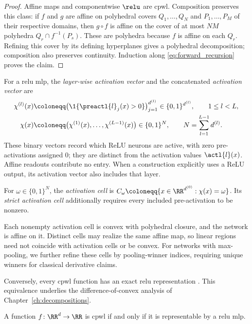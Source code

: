 \begin{proof}
Affine maps and componentwise $\relu$ are \ac{cpwl}. Composition preserves this class: if $f$ and $g$ are affine on polyhedral covers $Q_1, \ldots, Q_N$ and $P_1, \ldots, P_M$ of their respective domains, then $g\circ f$ is affine on the cover of at most $NM$ polyhedra $Q_r\cap f^{-1}(P_s)$. These are polyhedra because $f$ is affine on each $Q_r$. Refining this cover by its defining hyperplanes gives a polyhedral decomposition; composition also preserves continuity. Induction along \eqref{eq:forward_recursion} proves the claim.
\end{proof}

\begin{definition}\label{def:activation_vector}
For a \ac{relu} \ac{mlp}, the \emph{layer-wise activation vector} and the concatenated \emph{activation vector} are
\begin{align}
 \chi^{(l)}(x)&\coloneqq\bigl(\1\{\preactl{l}_j(x)>0\}\bigr)_{j=1}^{d^{(l)}}\in\{0,1\}^{d^{(l)}},\qquad 1\le l<L,\notag\\
 \chi(x)&\coloneqq\bigl(\chi^{(1)}(x),\ldots,\chi^{(L-1)}(x)\bigr)\in\{0,1\}^{N},\qquad N=\sum_{l=1}^{L-1}d^{(l)}.\label{eq:activation_vector}
\end{align}
These binary vectors record which ReLU neurons are active, with zero pre-activations assigned $0$; they are distinct from the activation values $\actl{l}(x)$. Affine readouts contribute no entry. When a construction explicitly uses a ReLU output, its activation vector also includes that layer.

For $\omega\in\{0,1\}^{N}$, the \emph{activation cell} is $C_\omega\coloneqq\{x\in\RR^{d^{(0)}}:\chi(x)=\omega\}$. Its \emph{strict activation cell} additionally requires every included pre-activation to be nonzero.
\end{definition}
Each nonempty activation cell is convex with polyhedral closure, and the network is affine on it. Distinct cells may realize the same affine map, so linear regions need not coincide with activation cells or be convex. For networks with max-pooling, we further refine these cells by pooling-winner indices, requiring unique winners for classical derivative claims.

Conversely, every \ac{cpwl} function has an exact \ac{relu} representation \parencite{Arora2018}. This equivalence underlies the difference-of-convex analysis of Chapter~\ref{ch:decompositions}.

\begin{theoremenv}\label{thm:cpwl_relu_equivalence}
A function $f \colon \RR^{d} \to \RR$ is \ac{cpwl} if and only if it is representable by a \ac{relu} \ac{mlp}.\end{theoremenv}

